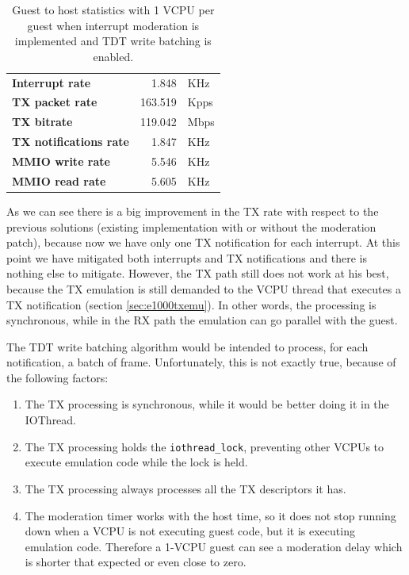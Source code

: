 \begin{table}
\begin{center}
\begin{tabular}{lrl}
\toprule
\textbf{Interrupt rate} & 1.848 & KHz\\
\textbf{TX packet rate} & 163.519 & Kpps\\
\textbf{TX bitrate} & 119.042 & Mbps\\
\textbf{TX notifications rate} & 1.847 & KHz\\
\textbf{MMIO write rate} & 5.546 & KHz\\
\textbf{MMIO read rate} & 5.605 & KHz\\
\bottomrule
\end{tabular}
\end{center}
\caption{Guest to host statistics with 1 VCPU per guest when interrupt moderation is implemented and TDT write batching is enabled.}
\label{tab:e1000-mit-bat-tx-g2h1vcpu}
\end{table}

As we can see there is a big improvement in the TX rate with respect to the previous solutions (existing implementation with or without
the moderation patch), because now we have only one TX notification for each interrupt. At this point we have mitigated
both interrupts and TX notifications and there is nothing else to mitigate.
However, the TX path still does not work at his best, because the TX emulation is still demanded to the VCPU thread that executes a
TX notification (section \ref{sec:e1000txemu}). In other words, the processing is synchronous, while in the RX path the emulation can 
go parallel with the guest.

The TDT write batching algorithm would be intended to process, for each notification, a batch of frame. Unfortunately, this is not
exactly true, because of the following factors:
\begin{enumerate}
    \item The TX processing is synchronous, while it would be better doing it in the IOThread.
    \item The TX processing holds the \texttt{iothread\_lock}, preventing other VCPUs to execute emulation code while the lock is held.
    \item The TX processing always processes all the TX descriptors it has.
    \item The moderation timer works with the host time, so it does not stop running down when a VCPU is not executing guest code, but
	  it is executing emulation code. Therefore a 1-VCPU guest can see a moderation delay which is shorter that expected or even
	  close to zero.
\end{enumerate}

